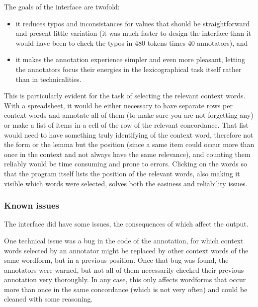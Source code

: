 \documentclass[
]{book}
\providecommand{\tightlist}{%
  \setlength{\itemsep}{0pt}\setlength{\parskip}{0pt}}
\begin{document}
The goals of the interface are twofold:

\begin{itemize}
\tightlist
\item
  it reduces typos and inconsistances for values that should be straightforward and present little variation (it was much faster to design the interface than it would have been to check the typos in 480 tokens times 40 annotators), and
\item
  it makes the annotation experience simpler and even more pleasant, letting the annotators focus their energies in the lexicographical task itself rather than in technicalities.
\end{itemize}

This is particularly evident for the task of selecting the relevant context words. With a spreadsheet, it would be either necessary to have separate rows per context words and annotate all of them (to make sure you are not forgetting any) or make a list of items in a cell of the row of the relevant concordance. That list would need to have something truly identifying of the context word, therefore not the form or the lemma but the position (since a same item could occur more than once in the context and not always have the same relevance), and counting them reliably would be time consuming and prone to errors. Clicking on the words so that the program itself lists the position of the relevant words, also making it visible which words were selected, solves both the easiness and reliability issues.

\hypertarget{known-issues}{%
\subsubsection{Known issues}\label{known-issues}}

The interface did have some issues, the consequences of which affect the output.

One technical issue was a bug in the code of the annotation, for which context words selected by an annotator might be replaced by other context words of the same wordform, but in a previous position. Once that bug was found, the annotators were warned, but not all of them necessarily checked their previous annotation very thoroughly. In any case, this only affects wordforms that occur more than once in the same concordance (which is not very often) and could be cleaned with some reasoning.
\end{document}
